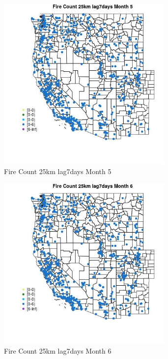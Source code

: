 \begin{figure} 
\centering  
\includegraphics[width=0.77\textwidth]{Code_Outputs/Report_ML_input_PM25_Step4_part_e_de_duplicated_aves_compiled_2019-05-21wNAs_MapObsMo5Fire_Count_25km_lag7days.jpg} 
\caption{\label{fig:Report_ML_input_PM25_Step4_part_e_de_duplicated_aves_compiled_2019-05-21wNAsMapObsMo5Fire_Count_25km_lag7days}Fire Count 25km lag7days Month 5} 
\end{figure} 
 

\begin{figure} 
\centering  
\includegraphics[width=0.77\textwidth]{Code_Outputs/Report_ML_input_PM25_Step4_part_e_de_duplicated_aves_compiled_2019-05-21wNAs_MapObsMo6Fire_Count_25km_lag7days.jpg} 
\caption{\label{fig:Report_ML_input_PM25_Step4_part_e_de_duplicated_aves_compiled_2019-05-21wNAsMapObsMo6Fire_Count_25km_lag7days}Fire Count 25km lag7days Month 6} 
\end{figure} 
 

